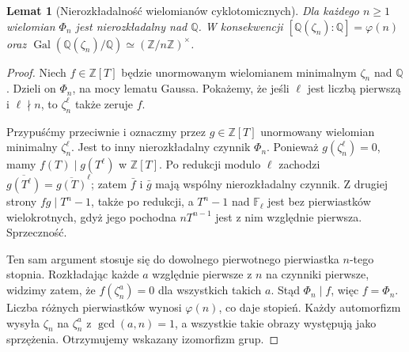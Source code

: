 \documentclass[11pt,a4paper,oneside]{book}
\numberwithin{equation}{section}
\theoremstyle{plain}
\newtheorem{lemat}[twierdzenie]{Lemat}
\theoremstyle{definition}
\theoremstyle{remark}
\newcommand{\Q}{\mathbb{Q}}
\newcommand{\Z}{\mathbb{Z}}
\newcommand{\F}{\mathbb{F}}
\newcommand{\Gal}{\operatorname{Gal}}
\begin{document}
\begin{lemat}[Nierozkładalność wielomianów cyklotomicznych]
Dla każdego $n\ge1$ wielomian $\Phi_n$ jest nierozkładalny nad $\Q$. W konsekwencji
$[\Q(\zeta_n):\Q]=\varphi(n)$ oraz
$\Gal(\Q(\zeta_n)/\Q)\simeq(\Z/n\Z)^\times$.
\end{lemat}
\begin{proof}
Niech $f\in\Z[T]$ będzie unormowanym wielomianem minimalnym $\zeta_n$ nad $\Q$. Dzieli on $\Phi_n$, na mocy lematu Gaussa. Pokażemy, że jeśli $\ell$ jest liczbą pierwszą i $\ell\nmid n$, to $\zeta_n^\ell$ także zeruje $f$.

Przypuśćmy przeciwnie i oznaczmy przez $g\in\Z[T]$ unormowany wielomian minimalny $\zeta_n^\ell$. Jest to inny nierozkładalny czynnik $\Phi_n$. Ponieważ $g(\zeta_n^\ell)=0$, mamy $f(T)\mid g(T^\ell)$ w $\Z[T]$. Po redukcji modulo $\ell$ zachodzi
$\overline{g(T^\ell)}=\overline{g(T)}^\ell$; zatem $\bar f$ i $\bar g$ mają wspólny nierozkładalny czynnik. Z drugiej strony $fg\mid T^n-1$, także po redukcji, a $T^n-1$ nad $\F_\ell$ jest bez pierwiastków wielokrotnych, gdyż jego pochodna $nT^{n-1}$ jest z nim względnie pierwsza. Sprzeczność.

Ten sam argument stosuje się do dowolnego pierwotnego pierwiastka $n$-tego stopnia. Rozkładając każde $a$ względnie pierwsze z $n$ na czynniki pierwsze, widzimy zatem, że $f(\zeta_n^a)=0$ dla wszystkich takich $a$. Stąd $\Phi_n\mid f$, więc $f=\Phi_n$. Liczba różnych pierwiastków wynosi $\varphi(n)$, co daje stopień. Każdy automorfizm wysyła $\zeta_n$ na $\zeta_n^a$ z $\gcd(a,n)=1$, a wszystkie takie obrazy występują jako sprzężenia. Otrzymujemy wskazany izomorfizm grup.
\end{proof}
\end{document}
